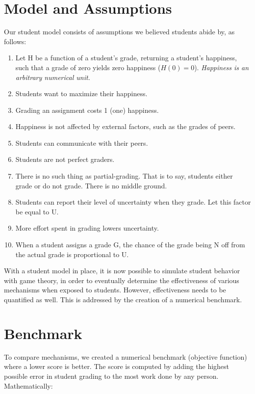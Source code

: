 \documentclass{chi-ext}
\begin{document}
\section{Model and Assumptions}
\label{sec:modelandassumptions}
Our student model consists of assumptions we believed students abide by, as follows:
\begin{enumerate}
  \item Let H be a function of a student's grade, returning a student's happiness, such that a grade of zero yields zero happiness ($H(0)=0$). \newline \textit{Happiness is an arbitrary numerical unit.}
  \item Students want to maximize their happiness.
  \item Grading an assignment costs 1 (one) happiness.
  \item Happiness is not affected by external factors, such as the grades of peers.
  \item Students can communicate with their peers.
  \item Students are not perfect graders.
  \item There is no such thing as partial-grading. That is to say, students either grade or do not grade. There is no middle ground.
  \item Students can report their level of uncertainty when they grade. Let this factor be equal to U.
  \item More effort spent in grading lowers uncertainty.
  \item When a student assigns a grade G, the chance of the grade being N off from the actual grade is proportional to U.
\end{enumerate}

With a student model in place, it is now possible to simulate student behavior with game theory, in order to eventually determine the effectiveness of various mechanisms when exposed to students. However, effectiveness needs to be quantified as well. This is addressed by the creation of a numerical benchmark.

\section{Benchmark}

To compare mechanisms, we created a numerical benchmark (objective function) where a lower score is better. The score is computed by adding the highest possible error in student grading to the most work done by any person. Mathematically:
\end{document}

